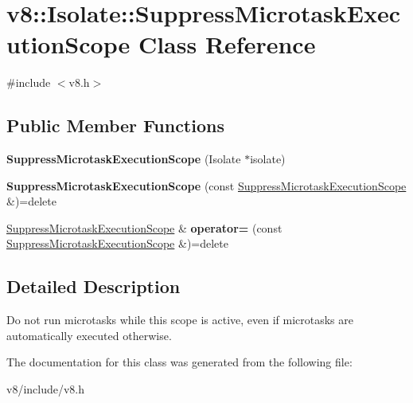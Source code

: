 \hypertarget{classv8_1_1Isolate_1_1SuppressMicrotaskExecutionScope}{}\section{v8\+:\+:Isolate\+:\+:Suppress\+Microtask\+Execution\+Scope Class Reference}
\label{classv8_1_1Isolate_1_1SuppressMicrotaskExecutionScope}


{\ttfamily \#include $<$v8.\+h$>$}

\subsection*{Public Member Functions}
\begin{DoxyCompactItemize}
\item 
\mbox{\label{classv8_1_1Isolate_1_1SuppressMicrotaskExecutionScope_a846d7dd39f4cfad4dfc4c8c785e4a65e}} 
{\bfseries Suppress\+Microtask\+Execution\+Scope} (Isolate $\ast$isolate)
\item 
\mbox{\label{classv8_1_1Isolate_1_1SuppressMicrotaskExecutionScope_ae4d7f51ceab47cabf1f78f65224ca95d}} 
{\bfseries Suppress\+Microtask\+Execution\+Scope} (const \mbox{\hyperlink{classv8_1_1Isolate_1_1SuppressMicrotaskExecutionScope}{Suppress\+Microtask\+Execution\+Scope}} \&)=delete
\item 
\mbox{\label{classv8_1_1Isolate_1_1SuppressMicrotaskExecutionScope_a48038b7c5037f6a329c27ccffef0e71c}} 
\mbox{\hyperlink{classv8_1_1Isolate_1_1SuppressMicrotaskExecutionScope}{Suppress\+Microtask\+Execution\+Scope}} \& {\bfseries operator=} (const \mbox{\hyperlink{classv8_1_1Isolate_1_1SuppressMicrotaskExecutionScope}{Suppress\+Microtask\+Execution\+Scope}} \&)=delete
\end{DoxyCompactItemize}


\subsection{Detailed Description}
Do not run microtasks while this scope is active, even if microtasks are automatically executed otherwise. 

The documentation for this class was generated from the following file\+:\begin{DoxyCompactItemize}
\item 
v8/include/v8.\+h\end{DoxyCompactItemize}
